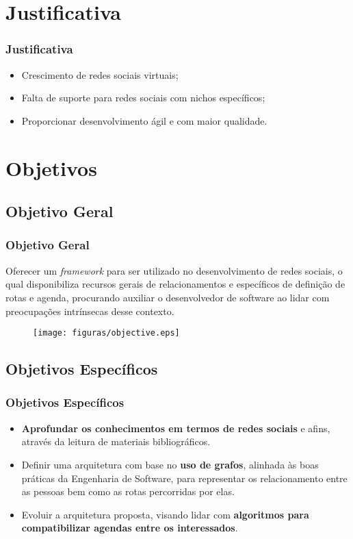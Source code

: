 \documentclass{beamer}
\begin{document}
\section{Justificativa}

\begin{frame}
\frametitle{Justificativa}

\begin{itemize}
	\item Crescimento de redes sociais virtuais;
	\item Falta de suporte para redes sociais com nichos específicos;
	\item Proporcionar desenvolvimento ágil e com maior qualidade.
\end{itemize}

\end{frame}


\section{Objetivos}
\subsection{Objetivo Geral}

\begin{frame}
\frametitle{Objetivo Geral}

Oferecer um \textit{framework} para ser utilizado no desenvolvimento de redes sociais, o qual disponibiliza recursos gerais de relacionamentos e específicos de definição de rotas e agenda, procurando auxiliar o desenvolvedor de software ao lidar com preocupações intrínsecas desse contexto.

\begin{figure}[h]
	\centering
	\texttt{[image: figuras/objective.eps]}
\end{figure}

\end{frame}

\subsection{Objetivos Específicos}

\begin{frame}
\frametitle{Objetivos Específicos}

\begin{itemize}
	\item \textbf{Aprofundar os conhecimentos em termos de redes sociais} e afins, através da leitura de materiais bibliográficos.
	\item Definir uma arquitetura com base no \textbf{uso de grafos}, alinhada às boas práticas da Engenharia de Software, para representar os relacionamento entre as pessoas bem como as rotas percorridas por elas.
	\item Evoluir a arquitetura proposta, visando lidar com \textbf{algoritmos para compatibilizar agendas entre os interessados}.
\end{itemize}

\end{frame}
\end{document}
